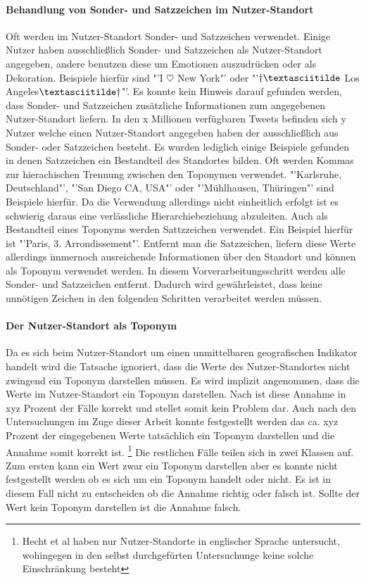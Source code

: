 					\paragraph{Behandlung von Sonder- und Satzzeichen im Nutzer-Standort} 
						Oft werden im Nutzer-Standort Sonder- und Satzzeichen verwendet. 
						Einige Nutzer haben ausschließlich Sonder- und Satzzeichen als Nutzer-Standort angegeben, andere benutzen diese um Emotionen auszudrücken oder als Dekoration. 
						Beispiele hierfür sind "'I $\heartsuit$ New York"' oder "'$\dagger\textasciitilde$ Los Angeles$\textasciitilde\dagger$"'.
						Es konnte kein Hinweis darauf gefunden werden, dass Sonder- und Satzzeichen zusätzliche Informationen zum angegebenen Nutzer-Standort liefern. 
						In den x Millionen verfügbaren Tweets befinden sich y Nutzer welche einen Nutzer-Standort angegeben haben der ausschließlich aus Sonder- oder Satzzeichen besteht. 
						Es wurden lediglich einige Beispiele gefunden in denen Satzzeichen ein Bestandteil des Standortes bilden.
						Oft werden Kommas zur hierachischen Trennung zwischen den Toponymen verwendet.
						"'Karlsruhe, Deutschland"', "'San Diego CA, USA"' oder "'Mühlhausen, Thüringen"' sind Beispiele hierfür.
						Da die Verwendung allerdings nicht einheitlich erfolgt ist es schwierig daraus eine verlässliche Hierarchiebeziehung abzuleiten.
						Auch als Bestandteil eines Toponyms werden Sattzzeichen verwendet.
						Ein Beispiel hierfür ist "'Paris, 3. Arrondissement"'.
						Entfernt man die Satzzeichen, liefern diese Werte allerdings immernoch ausreichende Informationen über den Standort und können als Toponym verwendet werden.  
						In diesem Vorverarbeitungsschritt werden alle Sonder- und Satzzeichen entfernt. 
						Dadurch wird gewährleistet, dass keine unnötigen Zeichen in den folgenden Schritten verarbeitet werden müssen. 

					\paragraph{Der Nutzer-Standort als Toponym} 
						Da es sich beim Nutzer-Standort um einen unmittelbaren geografischen Indikator handelt wird die Tatsache ignoriert, dass die Werte des Nutzer-Standortes nicht zwingend ein Toponym darstellen müssen. 
						Es wird implizit angenommen, dass die Werte im Nutzer-Standort ein Toponym darstellen.
						Nach \cite{Hecht2011} ist diese Annahme in xyz Prozent der Fälle korrekt und stellet somit kein Problem dar. 
						Auch nach den Untersuchungen im Zuge dieser Arbeit konnte festgestellt werden das ca. xyz Prozent der eingegebenen Werte tatsächlich ein Toponym darstellen und die Annahme somit korrekt ist. \footnote{
						Hecht et al haben nur Nutzer-Standorte in englischer Sprache untersucht, wohingegen in den selbst durchgefürten Untersuchunge keine solche Einschränkung besteht} 
						Die restlichen Fälle teilen sich in zwei Klassen auf. 
						Zum ersten kann ein Wert zwar ein Toponym darstellen aber es konnte nicht festgestellt werden ob es sich um ein Toponym handelt oder nicht.
						Es ist in diesem Fall nicht zu entscheiden ob die Annahme richtig oder falsch ist. 
						Sollte der Wert kein Toponym darstellen ist die Annahme falsch.

